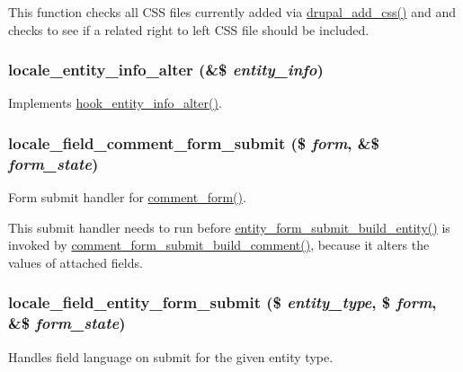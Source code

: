 This function checks all CSS files currently added via \hyperlink{common_8inc_a2c5bb2667efb44b02f1a105c0bfdebe5}{drupal\_\-add\_\-css()} and and checks to see if a related right to left CSS file should be included. \hypertarget{locale_8module_a071a656e0a5b2ac777ae4a70bd9258c1}{
\subsubsection[{locale\_\-entity\_\-info\_\-alter}]{\setlength{\rightskip}{0pt plus 5cm}locale\_\-entity\_\-info\_\-alter (\&\$ {\em entity\_\-info})}}
\label{locale_8module_a071a656e0a5b2ac777ae4a70bd9258c1}
Implements \hyperlink{group__hooks_ga0394a72e4872603e91ce22440195ab45}{hook\_\-entity\_\-info\_\-alter()}. \hypertarget{locale_8module_a9f8d1dee8869eb34d543583be5bbacba}{
\subsubsection[{locale\_\-field\_\-comment\_\-form\_\-submit}]{\setlength{\rightskip}{0pt plus 5cm}locale\_\-field\_\-comment\_\-form\_\-submit (\$ {\em form}, \/  \&\$ {\em form\_\-state})}}
\label{locale_8module_a9f8d1dee8869eb34d543583be5bbacba}
Form submit handler for \hyperlink{group__forms_ga86e714d86cac517f85b3cadf42ba2977}{comment\_\-form()}.

This submit handler needs to run before \hyperlink{common_8inc_a0aac8c55307d5f8bca09e44481bcfc9a}{entity\_\-form\_\-submit\_\-build\_\-entity()} is invoked by \hyperlink{comment_8module_abd5446f38e07ea95441adc78dbd3c968}{comment\_\-form\_\-submit\_\-build\_\-comment()}, because it alters the values of attached fields. \hypertarget{locale_8module_ad748e0a833a557c5435bd386f4b07290}{
\subsubsection[{locale\_\-field\_\-entity\_\-form\_\-submit}]{\setlength{\rightskip}{0pt plus 5cm}locale\_\-field\_\-entity\_\-form\_\-submit (\$ {\em entity\_\-type}, \/  \$ {\em form}, \/  \&\$ {\em form\_\-state})}}
\label{locale_8module_ad748e0a833a557c5435bd386f4b07290}
Handles field language on submit for the given entity type.


